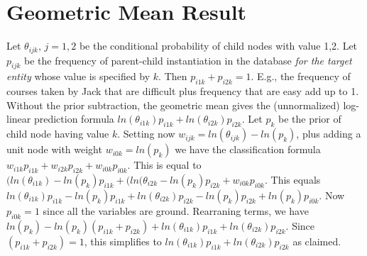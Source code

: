 \documentclass{article}
\begin{document}
\section{Geometric Mean Result}

Let $\theta_{ijk}$, $j=1,2$ be the conditional probability of child nodes with value 1,2. Let $p_{ijk}$ be the frequency of parent-child instantiation in the database {\em for the target entity} whose value is specified by $k$. Then $p_{i1k} + p_{i2k} = 1$. E.g., the frequency of courses taken by Jack that are difficult plus frequency that are easy add up to 1. Without the prior subtraction, the geometric mean gives the (unnormalized) log-linear prediction formula $ln(\theta_{i1k}) p_{i1k} + ln(\theta_{i2k}) p_{i2k}$. Let $p_{k}$ be the prior of child node having value $k$. Setting now $w_{ijk} = ln(\theta_{ijk}) - ln(p_{k})$, plus adding a unit node with weight $w_{i0k} = ln(p_{k})$ we have the classification formula $w_{i1k} p_{i1k} + w_{i2k} p_{i2k} + w_{i0k} p_{i0k}$. This is equal to $(ln(\theta_{i1k}) - ln(p_{k}) p_{i1k} + (ln(\theta_{i2k} - ln(p_{k}) p_{i2k} + w_{i0k} p_{i0k}$. This equals $ln(\theta_{i1k}) p_{i1k} - ln(p_{k}) p_{i1k} + ln(\theta_{i2k}) p_{i2k} - ln(p_{k}) p_{i2k} + ln(p_{k}) p_{i0k}.$ Now $p_{i0k} = 1$ since all the variables are ground. Rearraning terms, we have $ ln(p_{k}) - ln(p_{k}) (p_{i1k}+p_{i2k})   + ln(\theta_{i1k}) p_{i1k}+ ln(\theta_{i2k}) p_{i2k}.$ Since $(p_{i1k}+p_{i2k}) = 1$, this simplifies to $ln(\theta_{i1k}) p_{i1k}+ ln(\theta_{i2k}) p_{i2k}$ as claimed.
\end{document}
